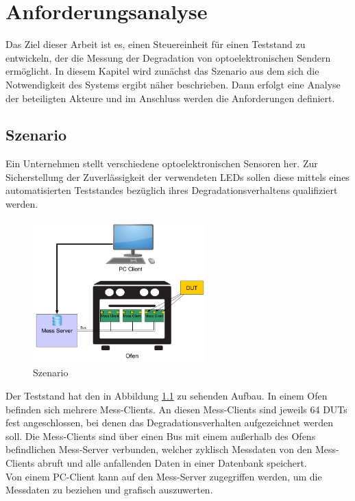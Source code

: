 
\chapter{Anforderungsanalyse}
\label{chapter_Anforderungsanalyse}
Das Ziel dieser Arbeit ist es, einen Steuereinheit für einen Teststand zu entwickeln, der die Messung der Degradation von optoelektronischen Sendern ermöglicht. In diesem Kapitel wird zunächst das Szenario aus dem sich die Notwendigkeit des Systems ergibt näher beschrieben. Dann erfolgt eine Analyse der beteiligten Akteure und im Anschluss werden die Anforderungen definiert.

\section{Szenario}
Ein Unternehmen stellt verschiedene optoelektronischen Sensoren her. Zur Sicherstellung der Zuverlässigkeit der verwendeten \acp{LED} sollen diese mittels eines automatisierten Teststandes bezüglich ihres Degradationsverhaltens qualifiziert werden.


\begin{figure}[H]
\begin{center}
\includegraphics[width=0.6\textwidth]{img/general/Szenario.png}
\caption{Szenario}
\label{figure_Szenario}
\end{center}
\end{figure}

Der Teststand hat den in Abbildung \ref{figure_Szenario} zu sehenden Aufbau.
In einem Ofen befinden sich mehrere Mess-Clients. An diesen Mess-Clients sind jeweils 64 \acp{DUT} fest angeschlossen, bei denen das Degradationsverhalten aufgezeichnet werden soll.
Die Mess-Clients sind über einen Bus mit einem außerhalb des Ofens befindlichen Mess-Server verbunden, welcher zyklisch Messdaten von den Mess-Clients abruft und alle anfallenden Daten in einer Datenbank speichert.\\
Von einem PC-Client kann auf den Mess-Server zugegriffen  werden, um die Messdaten zu beziehen und grafisch auszuwerten.\\

